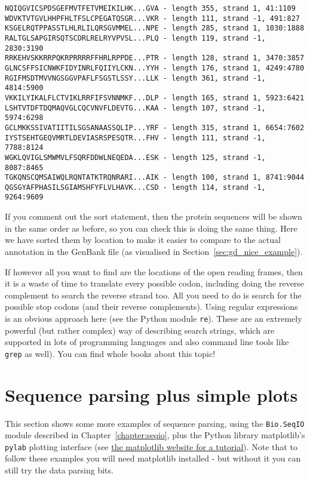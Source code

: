 \begin{verbatim}
NQIQGVICSPDSGEFMVTFETVMEIKILHK...GVA - length 355, strand 1, 41:1109
WDVKTVTGVLHHPFHLTFSLCPEGATQSGR...VKR - length 111, strand -1, 491:827
KSGELRQTPPASSTLHLRLILQRSGVMMEL...NPE - length 285, strand 1, 1030:1888
RALTGLSAPGIRSQTSCDRLRELRYVPVSL...PLQ - length 119, strand -1, 2830:3190
RRKEHVSKKRRPQKRPRRRRFFHRLRPPDE...PTR - length 128, strand 1, 3470:3857
GLNCSFFSICNWKFIDYINRLFQIIYLCKN...YYH - length 176, strand 1, 4249:4780
RGIFMSDTMVVNGSGGVPAFLFSGSTLSSY...LLK - length 361, strand -1, 4814:5900
VKKILYIKALFLCTVIKLRRFIFSVNNMKF...DLP - length 165, strand 1, 5923:6421
LSHTVTDFTDQMAQVGLCQCVNVFLDEVTG...KAA - length 107, strand -1, 5974:6298
GCLMKKSSIVATIITILSGSANAASSQLIP...YRF - length 315, strand 1, 6654:7602
IYSTSEHTGEQVMRTLDEVIASRSPESQTR...FHV - length 111, strand -1, 7788:8124
WGKLQVIGLSMWMVLFSQRFDDWLNEQEDA...ESK - length 125, strand -1, 8087:8465
TGKQNSCQMSAIWQLRQNTATKTRQNRARI...AIK - length 100, strand 1, 8741:9044
QGSGYAFPHASILSGIAMSHFYFLVLHAVK...CSD - length 114, strand -1, 9264:9609
\end{verbatim}

If you comment out the sort statement, then the protein sequences will be
shown in the same order as before, so you can check this is doing the same
thing.  Here we have sorted them by location to make it easier to compare
to the actual annotation in the GenBank file (as visualised in
Section~\ref{sec:gd_nice_example}).

If however all you want to find are the locations of the open reading frames,
then it is a waste of time to translate every possible codon, including doing
the reverse complement to search the reverse strand too.  All you need to do
is search for the possible stop codons (and their reverse complements).  Using
regular expressions is an obvious approach here (see the Python module
\verb|re|). These are an extremely powerful (but rather complex) way of
describing search strings, which are supported in lots of programming
languages and also command line tools like \texttt{grep} as well). You can
find whole books about this topic!


\section{Sequence parsing plus simple plots}
\label{sec:sequence-parsing-plus-pylab}

This section shows some more examples of sequence parsing, using the
\verb|Bio.SeqIO| module described in Chapter~\ref{chapter:seqio},
plus the Python library matplotlib's \verb|pylab| plotting interface
(see \href{https://matplotlib.org}{the matplotlib website
for a tutorial}).  Note that to follow these examples you will need
matplotlib installed - but without it you can still try the data
parsing bits.

